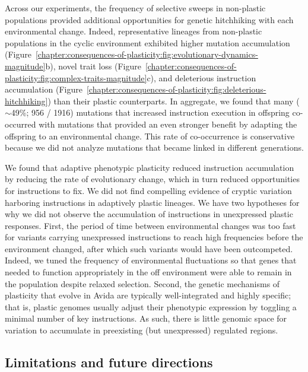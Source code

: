 Across our experiments, the frequency of selective sweeps in non-plastic populations provided additional opportunities for genetic hitchhiking with each environmental change. 
Indeed, representative lineages from non-plastic populations in the cyclic environment exhibited higher mutation accumulation (Figure~\ref{chapter:consequences-of-plasticity:fig:evolutionary-dynamics-magnitude}b), novel trait loss (Figure~\ref{chapter:consequences-of-plasticity:fig:complex-traits-magnitude}c), and deleterious instruction accumulation (Figure~\ref{chapter:consequences-of-plasticity:fig:deleterious-hitchhiking}) than their plastic counterparts.
In aggregate, we found that many ($\sim$49\%; 956 / 1916) mutations that increased  instruction execution in offspring co-occurred with mutations that provided an even stronger benefit by adapting the offspring to an environmental change.
This rate of co-occurrence is conservative because we did not analyze mutations that became linked in different generations.


We found that adaptive phenotypic plasticity reduced  instruction accumulation by reducing the rate of evolutionary change, which in turn reduced opportunities for  instructions to fix.
We did not find compelling evidence of cryptic variation harboring  instructions in adaptively plastic lineages.
We have two hypotheses for why we did not observe the accumulation of  instructions in unexpressed plastic responses.
First, the period of time between environmental changes was too fast for variants carrying unexpressed  instructions to reach high frequencies before the environment changed, after which such variants would have been outcompeted.
Indeed, we tuned the frequency of environmental fluctuations so that genes that needed to function appropriately in the off environment were able to remain in the population despite relaxed selection.
Second, the genetic mechanisms of plasticity that evolve in Avida are typically well-integrated and highly specific; that is, plastic genomes usually adjust their phenotypic expression by toggling a minimal number of key instructions. 
As such, there is little genomic space for variation to accumulate in preexisting (but unexpressed) regulated regions.

\subsection{Limitations and future directions}

